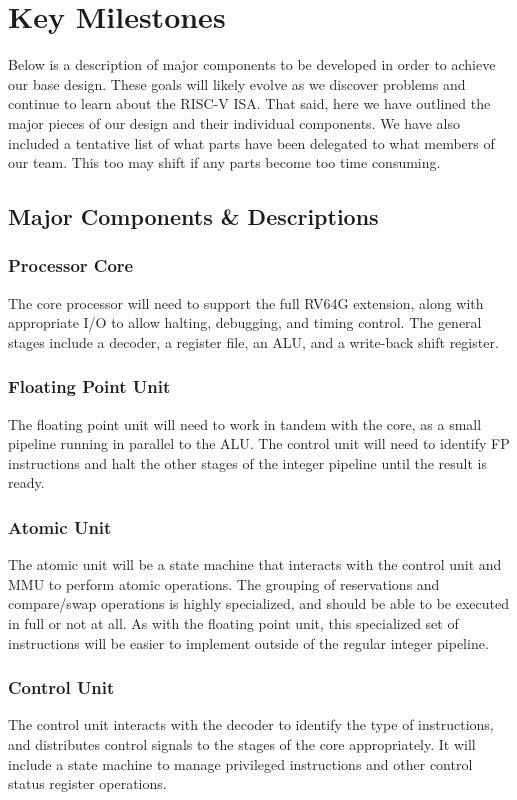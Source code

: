 \documentclass{article}
\begin{document}
\section{Key Milestones}
Below is a description of major components to be developed in order to achieve our base design.  These goals will likely evolve as we discover problems and continue to learn about the RISC-V ISA.  That said, here we have outlined the major pieces of our design and their individual components.  We have also included a tentative list of what parts have been delegated to what members of our team.  This too may shift if any parts become too time consuming.

\subsection{Major Components \& Descriptions}

    \subsubsection{Processor Core}
    The core processor will need to support the full RV64G extension, along with appropriate I/O to allow halting, debugging, and timing control.  The general stages include a decoder, a register file, an ALU, and a write-back shift register.
    
    \subsubsection{Floating Point Unit}
    The floating point unit will need to work in tandem with the core, as a small pipeline running in parallel to the ALU.  The control unit will need to identify FP instructions and halt the other stages of the integer pipeline until the result is ready.
    
    \subsubsection{Atomic Unit}
    The atomic unit will be a state machine that interacts with the control unit and MMU to perform atomic operations.  The grouping of reservations and compare/swap operations is highly specialized, and should be able to be executed in full or not at all.  As with the floating point unit, this specialized set of instructions will be easier to implement outside of the regular integer pipeline.
    
    \subsubsection{Control Unit}
    The control unit interacts with the decoder to identify the type of instructions, and distributes control signals to the stages of the core appropriately.  It will include a state machine to manage privileged instructions and other control status register operations.
    
\end{document}
